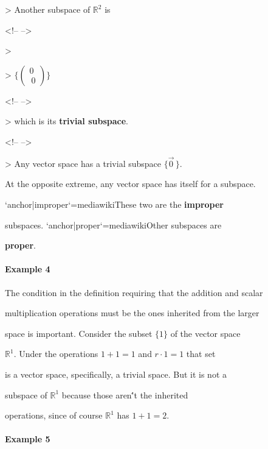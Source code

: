 >   Another subspace of $\mathbb{R}^2$ is



<!-- -->



>   



    >   $\{\begin{pmatrix} 0 \\\     0 \end{pmatrix}\}$



<!-- -->



>   which is its \textbf{trivial subspace}.



<!-- -->



>   Any vector space has a trivial subspace $\{\vec{0}\,\}$.



At the opposite extreme, any vector space has itself for a subspace.

`{{anchor|improper}}`{=mediawiki}These two are the \textbf{improper}

subspaces. `{{anchor|proper}}`{=mediawiki}Other subspaces are

\textbf{proper}.



\paragraph{Example 4}



The condition in the definition requiring that the addition and scalar

multiplication operations must be the ones inherited from the larger

space is important. Consider the subset $\{1\}$ of the vector space

$\mathbb{R}^1$. Under the operations $1+1=1$ and $r\cdot 1=1$ that set

is a vector space, specifically, a trivial space. But it is not a

subspace of $\mathbb{R}^1$ because those aren\''t the inherited

operations, since of course $\mathbb{R}^1$ has $1+1=2$.



\paragraph{Example 5}



